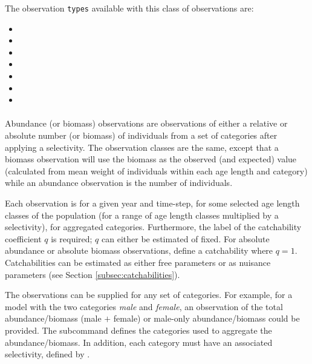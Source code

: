 The observation \texttt{types} available with this class of observations are:

\begin{itemize}
	\item {}
	\item {}
	\ifAgeBased
	\item {}
	\fi
	\item {}
	\item {}
	\item {}
	\ifAgeBased
	\item {}
	\fi
\end{itemize}

\paragraph*{}\label{sec:Observation-Abundance}\label{sec:Observation-Biomass}

Abundance (or biomass) observations are observations of either a relative or absolute number (or biomass) of individuals from a set of categories after applying a selectivity. The observation classes are the same, except that a biomass observation will use the biomass as the observed (and expected) value (calculated from mean weight of individuals within each \ifAgeBased age \else length \fi and category) while an abundance observation is the number of individuals.

Each observation is for a given year and time-step, for some selected \ifAgeBased age \else length \fi classes of the population (for a range of \ifAgeBased age \else length \fi classes multiplied by a selectivity), for aggregated categories. Furthermore, the label of the catchability coefficient $q$ is required;  $q$ can either be estimated of fixed. For absolute abundance or absolute biomass observations, define a catchability where $q=1$. Catchabilities can be estimated as either free parameters or as nuisance parameters (see Section \ref{subsec:catchabilities}).


The observations can be supplied for any set of categories. For example, for a model with the two categories \emph{male} and \emph{female}, an observation of the total abundance/biomass (male $+$ female) or male-only abundance/biomass could be provided. The subcommand  defines the categories used to aggregate the abundance/biomass. In addition, each category must have an associated selectivity, defined by .

